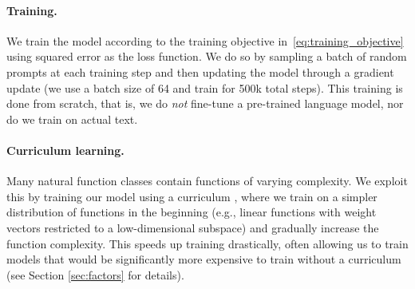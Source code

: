 \paragraph{Training.}
We train the model according to the training objective in~\eqref{eq:training_objective} using squared error as the loss function. 
We do so by sampling a batch of random prompts at each training step and then updating the model through a gradient update (we use a batch size of 64 and train for 500k total steps). 
This training is done from scratch, that is, we do \emph{not} fine-tune a pre-trained language model, nor do we train on actual text.

\paragraph{Curriculum learning.}
Many natural function classes contain functions of varying complexity. We exploit this by training our model using a curriculum \citep{bengio2009curriculum, elman1993learning, sanger1994neural, wu2020curricula}, where we train on a simpler distribution of functions in the beginning (e.g., linear functions with weight vectors restricted to a low-dimensional subspace) and gradually increase the function complexity.
This speeds up training drastically, 
often allowing us to train models that would be significantly more expensive to train without a curriculum (see Section \ref{sec:factors} for details).